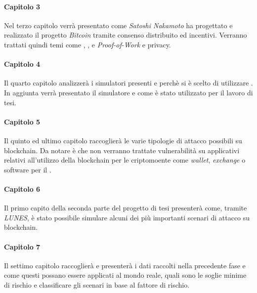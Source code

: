 \paragraph{Capitolo 3}
Nel terzo capitolo verrà presentato come \textit{Satoshi Nakamoto} ha progettato e realizzato il progetto \textit{Bitcoin} tramite consenso distribuito ed incentivi. Verranno trattati quindi temi come , ,  e \textit{Proof-of-Work} e privacy.

\paragraph{Capitolo 4}
Il quarto capitolo analizzerà i simulatori presenti e perchè si è scelto di utilizzare .
In aggiunta verrà presentato il simulatore e come è stato utilizzato per il lavoro di tesi.

\paragraph{Capitolo 5}
Il quinto ed ultimo capitolo raccoglierà le varie tipologie di attacco possibili su blockchain. Da notare è che non verranno trattate vulnerabilità su applicativi relativi all'utilizzo della blockchain per le criptomoente come \textit{wallet}, \textit{exchange} o software per il .

\paragraph{Capitolo 6}
Il primo capito della seconda parte del progetto di tesi presenterà come, tramite \textit{LUNES}, è stato possibile simulare alcuni dei più importanti scenari di attacco su blockchain.

\paragraph{Capitolo 7}
Il settimo capitolo raccoglierà e presenterà i dati raccolti nella precedente fase e come questi possano essere applicati al mondo reale, quali sono le soglie minime di rischio e classificare gli scenari in base al fattore di rischio.

